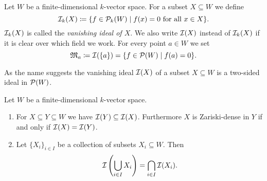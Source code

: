 \begin{defi}
  Let $W$ be a finite-dimensional $k$-vector space.
  For a subset $X \subseteq W$ we define
  \[
    \mathcal{I}_k(X)
    \coloneqq \{
                f \in \mathcal{P}_k(W)
              \mid
                f(x) = 0
                \text{ for all }
                x \in X 
              \}.
  \]
  $\mathcal{I}_k(X)$ is called the \emph{vanishing ideal of $X$}.
  We also write $\mathcal{I}(X)$ instead of $\mathcal{I}_k(X)$ if it is clear over which field we work.
  For every point $a \in W$ we set
  \[
              \mathfrak{M}_a
    \coloneqq \mathcal{I}(\{a\})
    =         \{
                f \in \mathcal{P}(W)
              \mid
                f(a) = 0
              \}.
  \]
\end{defi}


\begin{rem}
  As the name suggests the vanishing ideal $\mathcal{I}(X)$ of a subset $X \subseteq W$ is a two-sided ideal in $\mathcal{P}(W)$.
\end{rem}


\begin{rem}
  Let $W$ be a finite-dimensional $k$-vector space.
  \begin{enumerate}[label=\emph{\alph*)},leftmargin=*]
    \item
      For $X \subseteq Y \subseteq W$ we have $\mathcal{I}(Y) \subseteq \mathcal{I}(X)$.
      Furthermore $X$ is Zariski-dense in $Y$ if and only if $\mathcal{I}(X) = \mathcal{I}(Y)$.
    \item
      Let $\{X_i\}_{i \in I}$ be a collection of subsets $X_i \subseteq W$. Then
      \[
          \mathcal{I}\left( \bigcup_{i \in I} X_i \right)
        = \bigcap_{i \in I} \mathcal{I}(X_i).
      \]
  \end{enumerate}
\end{rem}


